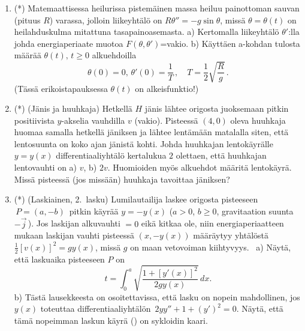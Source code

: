 \begin{enumerate}
\item (*) %
Matemaattisessa heilurissa pistemäinen massa heiluu painottoman sauvan (pituus $R$)
varassa, jolloin liikeyhtälö on $R\theta '' = -g \sin\theta$, missä $\theta=\theta(t)$ on
heilahduskulma mitattuna tasapainoasemasta.\vspace{1mm}\newline 
a) Kertomalla liikeyhtälö $\theta'$:lla johda energiaperiaate muotoa $F(\theta,\theta')$=vakio.
\newline
b) Käyttäen a-kohdan tulosta määrää $\theta(t),\, t\ge 0$ alkuehdoilla 
\[
\theta(0)=0,\, \theta'(0) = \frac{1}{T}\,, \quad T=\frac{1}{2}\sqrt{\frac{R}{g}}\,.
\]
(Tässä erikoistapauksessa $\theta(t)$ on alkeisfunktio!)

\item (*) 
(Jänis ja huuhkaja) Hetkellä $H$ jänis lähtee origosta juoksemaan pitkin positiivista
$y$-akselia vauhdilla $v$ (vakio). Pisteessä $(4,0)$ oleva huuhkaja huomaa samalla hetkellä
jäniksen ja lähtee lentämään matalalla siten, että lentosuunta on koko ajan jänistä kohti.
Johda huuhkajan lentokäyrälle $y=y(x)$ differentiaaliyhtälö kertalukua $2$ olettaen, että 
huuhkajan lentovauhti on a) $v$, b) $2v$. Huomioiden myös alkuehdot määritä
lentokäyrä. Missä pisteessä (jos missään) huuhkaja tavoittaa jäniksen?

\item (*) \label{H-dy-3: nopein liuku}  
%
(Laskiainen, 2.\ lasku) Lumilautailija laskee origosta pisteeseen $\,P=(a,-b)\,$ pitkin käyrää
$y=-y(x)$ ($a>0$, $b \ge 0$, gravitaation suunta $-\vec j\,$). Jos laskijan alkuvauhti $=0$
eikä kitkaa ole, niin energiaperiaatteen mukaan laskijan vauhti pisteessä $(x,-y(x))$ määräytyy
yhtälöstä $\frac{1}{2}[v(x)]^2=gy(x)$, missä $g$ on maan vetovoiman kiihtyvyys. \ a) Näytä,
että laskuaika pisteeseen $P$ on
\[
t=\int_0^a \sqrt{\frac{1+[y'(x)]^2}{2gy(x)}}\,dx.
\]
b) Tästä lausekkeesta on osoitettavissa, että lasku on nopein mahdollinen, jos $y(x)$ toteuttaa
differentiaaliyhtälön $\,2yy''+1+(y')^2=0$. Näytä, että tämä nopeimman laskun käyrä
() on sykloidin kaari.

\end{enumerate}